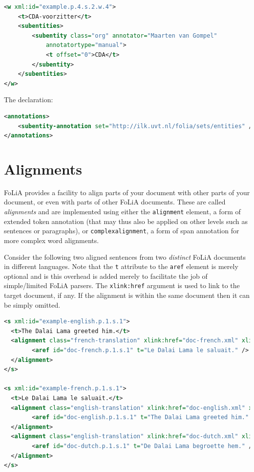 \documentclass[a4paper,12pt]{report}
\begin{document}
\begin{lstlisting}[language=xml]
<w xml:id="example.p.4.s.2.w.4">
    <t>CDA-voorzitter</t>
    <subentities>
        <subentity class="org" annotator="Maarten van Gompel"
            annotatortype="manual">
            <t offset="0">CDA</t>
        </subentity>
    </subentities>
</w>
\end{lstlisting}

The declaration:

\begin{lstlisting}[language=xml]
<annotations>
    <subentity-annotation set="http://ilk.uvt.nl/folia/sets/entities" />
</annotations>
\end{lstlisting}


\section{Alignments}

FoLiA provides a facility to align parts of your document with other parts of your document, or even with parts of other FoLiA documents. These are called \emph{alignments} and are implemented using either the \texttt{alignment} element, a form of extended token annotation (that may thus also be applied on other levels such as sentences or paragraphs), or \texttt{complexalignment}, a form of span annotation for more complex word alignments.

Consider the following two aligned sentences from two \emph{distinct} FoLiA documents in different languages. Note that the \texttt{t} attribute to the \texttt{aref} element is merely optional and is this overhead is added merely to facilitate the job of simple/limited FoLiA parsers. The \texttt{xlink:href} argument is used to link to the target document, if any. If the alignment is within the same document then it can be simply omitted.

\begin{lstlisting}[language=xml]
<s xml:id="example-english.p.1.s.1">
  <t>The Dalai Lama greeted him.</t>
  <alignment class="french-translation" xlink:href="doc-french.xml" xlink:type="simple">
        <aref id="doc-french.p.1.s.1" t="Le Dalai Lama le saluait." />
  </alignment>
</s>

<s xml:id="example-french.p.1.s.1">
  <t>Le Dalai Lama le saluait.</t>
  <alignment class="english-translation" xlink:href="doc-english.xml" xlink:type="simple">
        <aref id="doc-english.p.1.s.1" t="The Dalai Lama greeted him." />
  </alignment>
  <alignment class="english-translation" xlink:href="doc-dutch.xml" xlink:type="simple">
        <aref id="doc-dutch.p.1.s.1" t="De Dalai Lama begroette hem." />
  </alignment>
</s>
\end{lstlisting}
\end{document}
